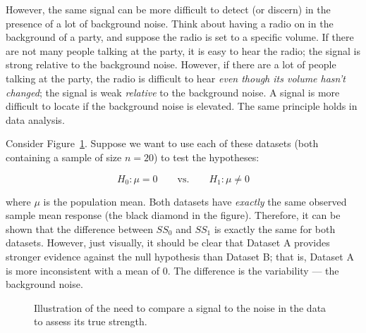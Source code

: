 \documentclass[
  letterpaper,
  DIV=11,
  numbers=noendperiod]{scrreprt}
\theoremstyle{definition}
\theoremstyle{definition}
\theoremstyle{plain}
\theoremstyle{remark}
\begin{document}
However, the same signal can be more difficult to detect (or discern) in
the presence of a lot of background noise. Think about having a radio on
in the background of a party, and suppose the radio is set to a specific
volume. If there are not many people talking at the party, it is easy to
hear the radio; the signal is strong relative to the background noise.
However, if there are a lot of people talking at the party, the radio is
difficult to hear \emph{even though its volume hasn't changed}; the
signal is weak \emph{relative} to the background noise. A signal is more
difficult to locate if the background noise is elevated. The same
principle holds in data analysis.

Consider Figure~\ref{fig-teststat-signal-to-noise}. Suppose we want to
use each of these datasets (both containing a sample of size \(n = 20\))
to test the hypotheses:

\[H_0: \mu = 0 \qquad \text{vs.} \qquad H_1: \mu \neq 0\]

where \(\mu\) is the population mean. Both datasets have \emph{exactly}
the same observed sample mean response (the black diamond in the
figure). Therefore, it can be shown that the difference between \(SS_0\)
and \(SS_1\) is exactly the same for both datasets. However, just
visually, it should be clear that Dataset A provides stronger evidence
against the null hypothesis than Dataset B; that is, Dataset A is more
inconsistent with a mean of 0. The difference is the variability --- the
background noise.

\begin{figure}


\caption{\label{fig-teststat-signal-to-noise}Illustration of the need to
compare a signal to the noise in the data to assess its true strength.}

\end{figure}%
\end{document}
